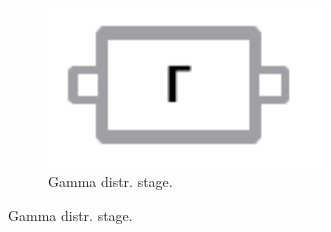 \begin{figure}[!ht]
\begin{subfigure}[c]{0.2\textwidth}
 \end{subfigure} \hfill
 \begin{subfigure}[c]{0.2\textwidth}
   \centering
 	\includegraphics[width=0.8\textwidth]{fig/guigammap.pdf}
 	\caption{Gamma distr. stage.} \label{fig:itemgammap}
 \end{subfigure}
 

\end{figure}
